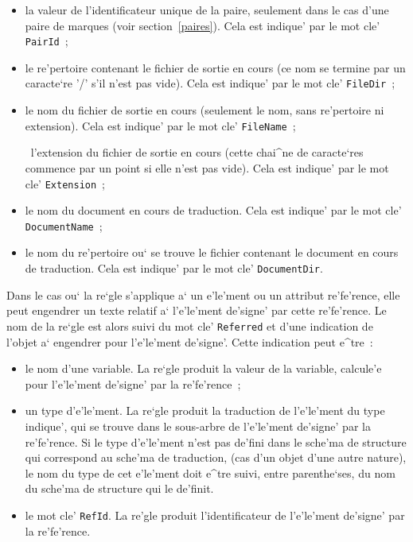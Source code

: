 {\begin{itemize}
\item la valeur de l'identificateur unique de la paire, seulement dans le cas
 d'une paire de marques (voir section~\ref{paires}). Cela est indique' par le
 mot cle' {\tt PairId}~;

\item le re'pertoire contenant le fichier de sortie en cours (ce nom
se termine par un caracte`re '/' s'il n'est pas vide). Cela est indique'
par le mot cle' {\tt FileDir}~;

\item le nom du fichier de sortie en cours (seulement le nom, sans re'pertoire
ni extension). Cela est indique' par le mot cle' {\tt FileName}~;

\ l'extension du fichier de sortie en cours (cette chai^ne de caracte`res
commence par un point si elle n'est pas vide). Cela est indique' par le mot
cle' {\tt Extension}~;

\item le nom du document en cours de traduction. Cela est indique' par le
 mot cle' {\tt DocumentName}~;

\item le nom du re'pertoire ou` se trouve le fichier contenant le document
 en cours de traduction. Cela est indique' par le mot cle' {\tt DocumentDir}.
\end{itemize}

Dans le cas ou` la re`gle s'applique a` un e'le'ment ou un attribut
re'fe'rence, elle peut engendrer un texte relatif a` l'e'le'ment
de'signe' par cette re'fe'rence. Le nom de la re`gle est alors suivi
du mot cle' {\tt Referred} et d'une indication de l'objet a` engendrer
pour l'e'le'ment de'signe'. Cette indication peut e^tre~:

\begin{itemize}
\item le nom d'une variable. La re`gle produit la valeur de la variable,
 calcule'e pour l'e'le'ment de'signe' par la re'fe'rence~;

\item un type d'e'le'ment. La re`gle produit la traduction de l'e'le'ment
 du type indique', qui se trouve dans le sous-arbre de l'e'le'ment
 de'signe' par la re'fe'rence.
 Si le type d'e'le'ment n'est pas de'fini dans le sche'ma de structure qui
 correspond au sche'ma de traduction, (cas d'un objet d'une autre nature),
 le nom du type de cet e'le'ment doit e^tre suivi, entre parenthe`ses,
 du nom du sche'ma de structure qui le de'finit.

\item le mot cle' {\tt RefId}. La re'gle produit l'identificateur de
 l'e'le'ment de'signe' par la re'fe'rence.


\end{itemize}}
